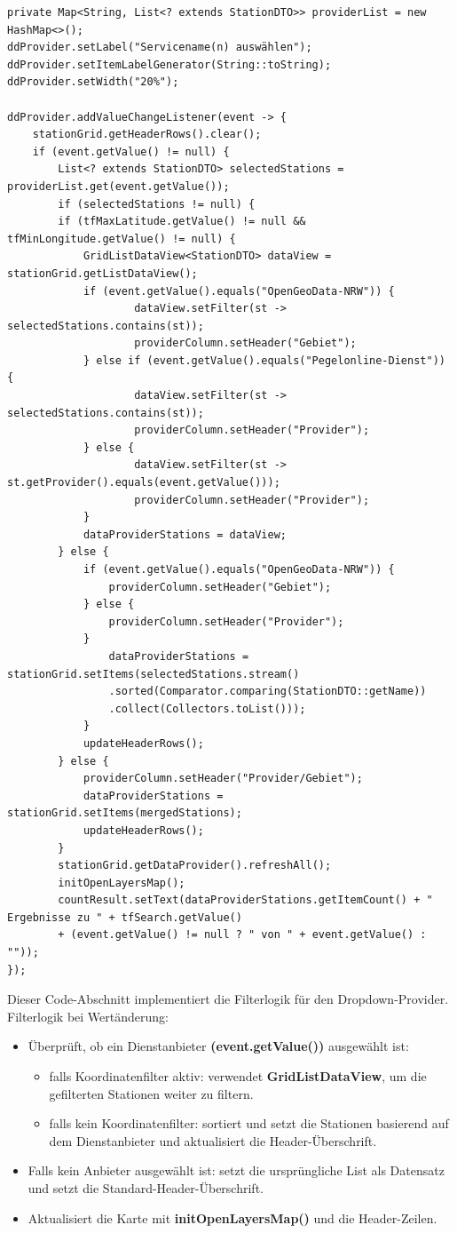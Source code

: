 \documentclass[a4paper,12pt]{scrreprt}
\begin{document}
\begin{lstlisting}
private Map<String, List<? extends StationDTO>> providerList = new HashMap<>();
ddProvider.setLabel("Servicename(n) auswählen");
ddProvider.setItemLabelGenerator(String::toString);
ddProvider.setWidth("20%");
	
ddProvider.addValueChangeListener(event -> {
	stationGrid.getHeaderRows().clear();
	if (event.getValue() != null) {
		List<? extends StationDTO> selectedStations = providerList.get(event.getValue());
		if (selectedStations != null) {
		if (tfMaxLatitude.getValue() != null && tfMinLongitude.getValue() != null) {
			GridListDataView<StationDTO> dataView = stationGrid.getListDataView();
			if (event.getValue().equals("OpenGeoData-NRW")) {
					dataView.setFilter(st -> selectedStations.contains(st));
					providerColumn.setHeader("Gebiet");
			} else if (event.getValue().equals("Pegelonline-Dienst")) {
					dataView.setFilter(st -> selectedStations.contains(st));
					providerColumn.setHeader("Provider");
			} else {
					dataView.setFilter(st -> st.getProvider().equals(event.getValue()));
					providerColumn.setHeader("Provider");
			}
			dataProviderStations = dataView;
		} else {
			if (event.getValue().equals("OpenGeoData-NRW")) {
				providerColumn.setHeader("Gebiet");
			} else {
				providerColumn.setHeader("Provider");
			}
				dataProviderStations = stationGrid.setItems(selectedStations.stream()
				.sorted(Comparator.comparing(StationDTO::getName))
				.collect(Collectors.toList()));
			}
			updateHeaderRows();
		} else {
			providerColumn.setHeader("Provider/Gebiet");
			dataProviderStations = stationGrid.setItems(mergedStations);
			updateHeaderRows();
		}
		stationGrid.getDataProvider().refreshAll();
		initOpenLayersMap();
		countResult.setText(dataProviderStations.getItemCount() + " Ergebnisse zu " + tfSearch.getValue()
		+ (event.getValue() != null ? " von " + event.getValue() : ""));
});
\end{lstlisting}
Dieser Code-Abschnitt implementiert die Filterlogik für den Dropdown-Provider.\\
Filterlogik bei Wertänderung:
\begin{itemize}
	\item Überprüft, ob ein Dienstanbieter \textbf{(event.getValue())} ausgewählt ist:
	\begin{itemize}
		\item falls Koordinatenfilter aktiv: verwendet \textbf{GridListDataView}, um die gefilterten Stationen weiter zu filtern.
		\item falls kein Koordinatenfilter: sortiert und setzt die Stationen basierend auf dem Dienstanbieter und aktualisiert die Header-Überschrift.
	\end{itemize}
	\item Falls kein Anbieter ausgewählt ist: setzt die ursprüngliche List als Datensatz und setzt die Standard-Header-Überschrift.
	\item Aktualisiert die Karte mit \textbf{initOpenLayersMap()} und die Header-Zeilen. 
\end{itemize}
\end{document}

